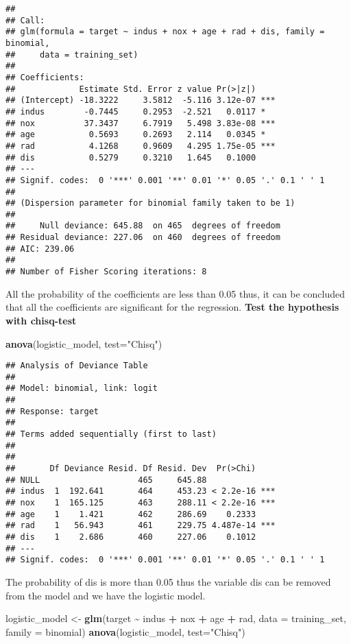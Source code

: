 \documentclass[
]{article}
\newenvironment{Shaded}{\begin{snugshade}}{\end{snugshade}}
\newcommand{\AttributeTok}[1]{\textcolor[rgb]{0.13,0.29,0.53}{#1}}
\newcommand{\FunctionTok}[1]{\textcolor[rgb]{0.13,0.29,0.53}{\textbf{#1}}}
\newcommand{\NormalTok}[1]{#1}
\newcommand{\OtherTok}[1]{\textcolor[rgb]{0.56,0.35,0.01}{#1}}
\newcommand{\SpecialCharTok}[1]{\textcolor[rgb]{0.81,0.36,0.00}{\textbf{#1}}}
\newcommand{\StringTok}[1]{\textcolor[rgb]{0.31,0.60,0.02}{#1}}
\begin{document}
\begin{verbatim}
## 
## Call:
## glm(formula = target ~ indus + nox + age + rad + dis, family = binomial, 
##     data = training_set)
## 
## Coefficients:
##             Estimate Std. Error z value Pr(>|z|)    
## (Intercept) -18.3222     3.5812  -5.116 3.12e-07 ***
## indus        -0.7445     0.2953  -2.521   0.0117 *  
## nox          37.3437     6.7919   5.498 3.83e-08 ***
## age           0.5693     0.2693   2.114   0.0345 *  
## rad           4.1268     0.9609   4.295 1.75e-05 ***
## dis           0.5279     0.3210   1.645   0.1000    
## ---
## Signif. codes:  0 '***' 0.001 '**' 0.01 '*' 0.05 '.' 0.1 ' ' 1
## 
## (Dispersion parameter for binomial family taken to be 1)
## 
##     Null deviance: 645.88  on 465  degrees of freedom
## Residual deviance: 227.06  on 460  degrees of freedom
## AIC: 239.06
## 
## Number of Fisher Scoring iterations: 8
\end{verbatim}

All the probability of the coefficients are less than 0.05 thus, it can
be concluded that all the coefficients are significant for the
regression. \textbf{Test the hypothesis with chisq-test}

\begin{Shaded}
\begin{Highlighting}[]
\FunctionTok{anova}\NormalTok{(logistic\_model, }\AttributeTok{test=}\StringTok{"Chisq"}\NormalTok{)}
\end{Highlighting}
\end{Shaded}

\begin{verbatim}
## Analysis of Deviance Table
## 
## Model: binomial, link: logit
## 
## Response: target
## 
## Terms added sequentially (first to last)
## 
## 
##       Df Deviance Resid. Df Resid. Dev  Pr(>Chi)    
## NULL                    465     645.88              
## indus  1  192.641       464     453.23 < 2.2e-16 ***
## nox    1  165.125       463     288.11 < 2.2e-16 ***
## age    1    1.421       462     286.69    0.2333    
## rad    1   56.943       461     229.75 4.487e-14 ***
## dis    1    2.686       460     227.06    0.1012    
## ---
## Signif. codes:  0 '***' 0.001 '**' 0.01 '*' 0.05 '.' 0.1 ' ' 1
\end{verbatim}

The probability of dis is more than 0.05 thus the variable dis can be
removed from the model and we have the logistic model.

\begin{Shaded}
\begin{Highlighting}[]
\NormalTok{logistic\_model }\OtherTok{\textless{}{-}}  \FunctionTok{glm}\NormalTok{(target }\SpecialCharTok{\textasciitilde{}}\NormalTok{ indus }\SpecialCharTok{+}\NormalTok{ nox }\SpecialCharTok{+}\NormalTok{ age }\SpecialCharTok{+}\NormalTok{ rad, }\AttributeTok{data =}\NormalTok{ training\_set, }\AttributeTok{family =}\NormalTok{ binomial)}
\FunctionTok{anova}\NormalTok{(logistic\_model, }\AttributeTok{test=}\StringTok{"Chisq"}\NormalTok{)}
\end{Highlighting}
\end{Shaded}
\end{document}
